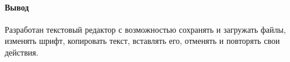 \paragraph{Вывод}
Разработан текстовый редактор с возможностью сохранять и загружать файлы, изменять шрифт, копировать текст, вставлять его, отменять и повторять свои действия.